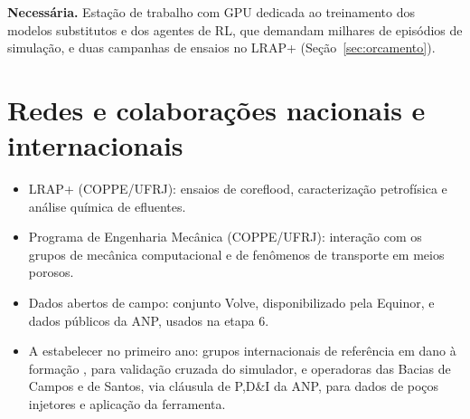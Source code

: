 \documentclass[11pt,a4paper]{article}
\newcommand{\itemedital}[1]{}
\begin{document}
\textbf{Necessária.} Estação de trabalho com GPU dedicada ao treinamento dos modelos
substitutos e dos agentes de RL, que demandam milhares de episódios de simulação, e
duas campanhas de ensaios no LRAP+ (Seção~\ref{sec:orcamento}).

\section{Redes e colaborações nacionais e internacionais}\itemedital{2.16 XX}
\begin{itemize}
  \item LRAP+ (COPPE/UFRJ): ensaios de coreflood, caracterização petrofísica e análise
        química de efluentes.
  \item Programa de Engenharia Mecânica (COPPE/UFRJ): interação com os grupos de
        mecânica computacional e de fenômenos de transporte em meios porosos.
  \item Dados abertos de campo: conjunto Volve, disponibilizado pela Equinor, e dados públicos
        da ANP, usados na etapa 6.
  \item A estabelecer no primeiro ano: grupos internacionais de referência em dano à
        formação \cite{bedrikovetsky2001,pangsharma1997}, para validação cruzada do
        simulador, e operadoras das Bacias de Campos e de Santos, via cláusula de P,D\&I
        da ANP, para dados de poços injetores e aplicação da ferramenta.
\end{itemize}

\end{document}
